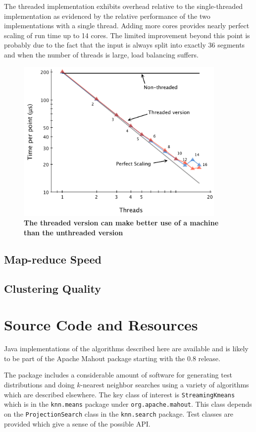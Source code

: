 \documentclass[11pt]{amsart}
\begin{document}
The threaded implementation exhibits  overhead relative to the single-threaded implementation as evidenced by the relative performance of the two implementations with a single thread.  Adding more cores provides nearly perfect scaling of run time up to 14 cores.  The limited improvement beyond this point is probably due to the fact that the input is always split into exactly 36 segments and when the number of threads is large, load balancing suffers.  
\begin{figure}[htbp]
\begin{center}
\includegraphics[width=4in]{thread-timing-16-core-1M.pdf}
\caption{{\bf The threaded version can make better use of a machine than the unthreaded version}}
\label{threaded-timing-16-core}
\end{center}
\end{figure}
\subsection{Map-reduce Speed}
\subsection{Clustering Quality}

\section{Source Code and Resources}
Java implementations of the algorithms described here are available \cite{github/knn} and is likely to be part of the Apache Mahout package starting with the 0.8 release.

The package includes a considerable amount of software for generating test distributions and doing $k$-nearest neighbor searches using a variety of algorithms which are described elsewhere.  The key class of interest is {\tt StreamingKmeans} which is in the {\tt knn.means} package under {\tt org.apache.mahout}.  This class depends on the {\tt ProjectionSearch} class in the {\tt knn.search} package.  Test classes are provided which give a sense of the possible API.
{}

\end{document}
